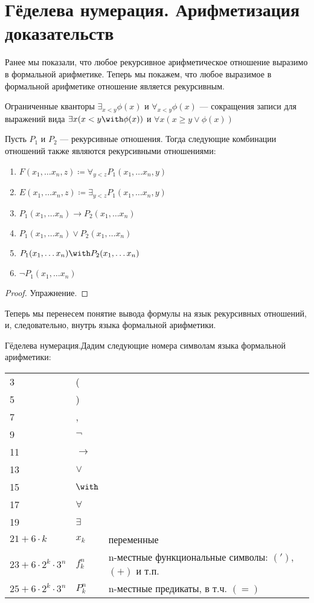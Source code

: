 \section{Гёделева нумерация. Арифметизация доказательств}

Ранее мы показали, что любое рекурсивное арифметическое отношение 
выразимо в формальной арифметике. Теперь мы покажем, что 
любое выразимое в формальной арифметике отношение является рекурсивным.

\begin{definition} Ограниченные кванторы $\exists_{x<y} \phi(x)$ и
$\forall_{x<y} \phi(x)$ --- сокращения записи для выражений вида 
$\exists x (x < y \with \phi(x))$ и $\forall x (x \ge y \vee \phi (x))$
\end{definition}

\begin{theorem}\label{recursive_relation_logic} Пусть $P_1$ и $P_2$ --- рекурсивные отношения.
Тогда следующие комбинации отношений также являются рекурсивными отношениями:

\begin{enumerate}
\item $F(x_1,\dots x_n,z) \coloneqq  \forall_{y<z} P_1(x_1,\dots x_n,y)$
\item $E(x_1, \dots x_n,z) \coloneqq  \exists_{y<z} P_1(x_1,\dots x_n,y)$
\item $P_1(x_1,\dots x_n) \rightarrow P_2(x_1,\dots x_n)$
\item $P_1(x_1,\dots x_n) \vee P_2(x_1,\dots x_n)$
\item $P_1(x_1,\dots x_n) \with P_2(x_1,\dots x_n)$
\item $\neg P_1(x_1, \dots x_n)$
\end{enumerate}
\end{theorem}

\begin{proof}Упражнение.
\end{proof}

Теперь мы перенесем понятие вывода формулы на язык рекурсивных отношений,
и, следовательно, внутрь языка формальной арифметики.

\begin{definition}{Гёделева нумерация.}Дадим следующие номера символам языка
формальной арифметики:

\begin{tabular}{lll}
3 & (\\
5 & )\\
7 & ,\\
9 & $\neg$ \\
11 & $\rightarrow$ \\
13 & $\vee$ \\
15 & $\with$ \\
17 & $\forall$ \\
19 & $\exists$ \\
$21 + 6\cdot k$ & $x_k$ & переменные\\
$23 + 6\cdot 2^k \cdot 3^n$ & $f_k^n$ & n-местные функциональные символы: $(')$, $(+)$ и т.п.\\
$25 + 6\cdot 2^k \cdot 3^n$ & $P_k^n$ & n-местные предикаты, в т.ч. $(=)$
\end{tabular}
\end{definition}

